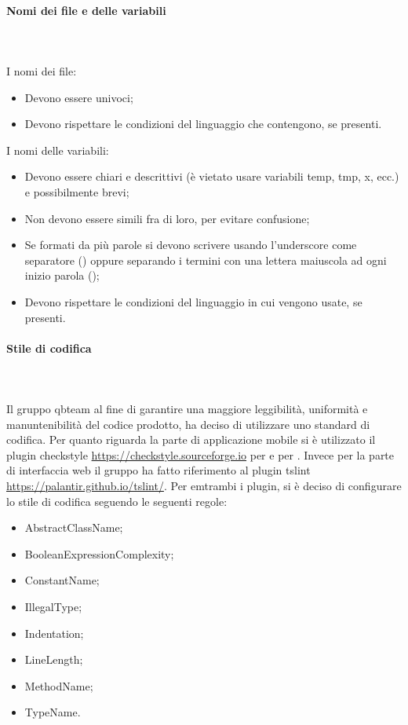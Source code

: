 \paragraph{Nomi dei file e delle variabili}\mbox{}\\ \\
I nomi dei file:
\begin{itemize}
    \item Devono essere univoci;
    \item Devono rispettare le condizioni del linguaggio che contengono, se presenti.
\end{itemize}
I nomi delle variabili:
\begin{itemize}
    \item Devono essere chiari e descrittivi (è vietato usare variabili temp, tmp, x, ecc.) e possibilmente brevi;
    \item Non devono essere simili fra di loro, per evitare confusione;
    \item Se formati da più parole si devono scrivere usando l'underscore come separatore () oppure separando i termini con una lettera maiuscola ad ogni inizio parola ();
    \item Devono rispettare le condizioni del linguaggio in cui vengono usate, se presenti.
\end{itemize}

\paragraph{Stile di codifica}\mbox{}\\ \\
Il gruppo qbteam al fine di garantire una maggiore leggibilità, uniformità e manuntenibilità del codice prodotto, ha deciso di utilizzare uno standard di codifica. Per quanto riguarda la parte di applicazione mobile si è utilizzato il plugin checkstyle \href{https://checkstyle.sourceforge.io}{https://checkstyle.sourceforge.io} per  e per . Invece per la parte di interfaccia web il gruppo ha fatto riferimento al plugin tslint \href{https://palantir.github.io/tslint/}{https://palantir.github.io/tslint/}. 
Per emtrambi i plugin, si è deciso di configurare lo stile di codifica seguendo le seguenti regole:
\begin{itemize}
	\item AbstractClassName;
	\item BooleanExpressionComplexity;
	\item ConstantName;
	\item IllegalType;
	\item Indentation;
	\item LineLength;
	\item MethodName;
	\item TypeName.
\end{itemize}

